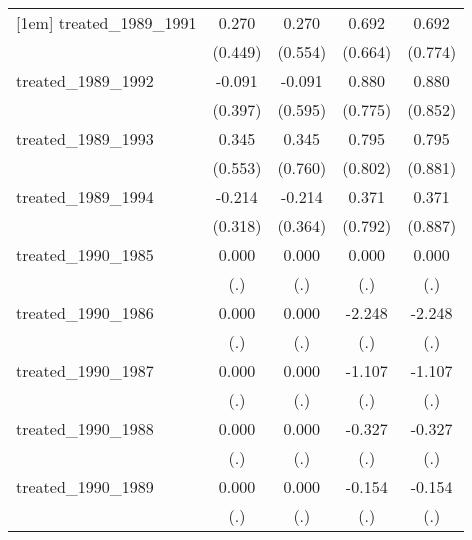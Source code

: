 {\begin{tabular}{l*{4}{c}}
[1em]
treated\_1989\_1991&       0.270         &       0.270         &       0.692         &       0.692         \\
            &     (0.449)         &     (0.554)         &     (0.664)         &     (0.774)         \\
[1em]
treated\_1989\_1992&      -0.091         &      -0.091         &       0.880         &       0.880         \\
            &     (0.397)         &     (0.595)         &     (0.775)         &     (0.852)         \\
[1em]
treated\_1989\_1993&       0.345         &       0.345         &       0.795         &       0.795         \\
            &     (0.553)         &     (0.760)         &     (0.802)         &     (0.881)         \\
[1em]
treated\_1989\_1994&      -0.214         &      -0.214         &       0.371         &       0.371         \\
            &     (0.318)         &     (0.364)         &     (0.792)         &     (0.887)         \\
[1em]
treated\_1990\_1985&       0.000         &       0.000         &       0.000         &       0.000         \\
            &         (.)         &         (.)         &         (.)         &         (.)         \\
[1em]
treated\_1990\_1986&       0.000         &       0.000         &      -2.248         &      -2.248         \\
            &         (.)         &         (.)         &         (.)         &         (.)         \\
[1em]
treated\_1990\_1987&       0.000         &       0.000         &      -1.107         &      -1.107         \\
            &         (.)         &         (.)         &         (.)         &         (.)         \\
[1em]
treated\_1990\_1988&       0.000         &       0.000         &      -0.327         &      -0.327         \\
            &         (.)         &         (.)         &         (.)         &         (.)         \\
[1em]
treated\_1990\_1989&       0.000         &       0.000         &      -0.154         &      -0.154         \\
            &         (.)         &         (.)         &         (.)         &         (.)         \\

\end{tabular}}
